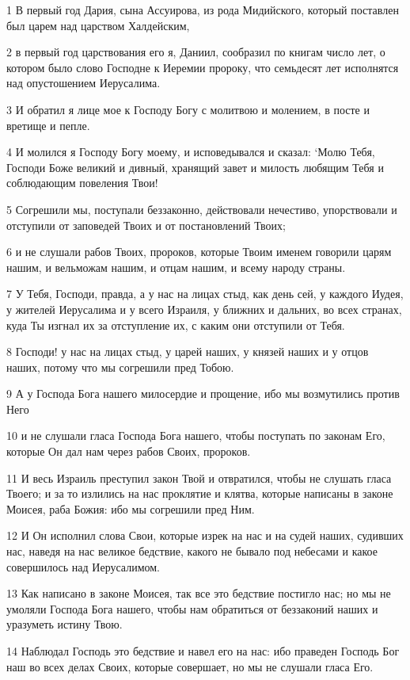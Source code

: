 \par 1 В первый год Дария, сына Ассуирова, из рода Мидийского, который поставлен был царем над царством Халдейским,
\par 2 в первый год царствования его я, Даниил, сообразил по книгам число лет, о котором было слово Господне к Иеремии пророку, что семьдесят лет исполнятся над опустошением Иерусалима.
\par 3 И обратил я лице мое к Господу Богу с молитвою и молением, в посте и вретище и пепле.
\par 4 И молился я Господу Богу моему, и исповедывался и сказал: `Молю Тебя, Господи Боже великий и дивный, хранящий завет и милость любящим Тебя и соблюдающим повеления Твои!
\par 5 Согрешили мы, поступали беззаконно, действовали нечестиво, упорствовали и отступили от заповедей Твоих и от постановлений Твоих;
\par 6 и не слушали рабов Твоих, пророков, которые Твоим именем говорили царям нашим, и вельможам нашим, и отцам нашим, и всему народу страны.
\par 7 У Тебя, Господи, правда, а у нас на лицах стыд, как день сей, у каждого Иудея, у жителей Иерусалима и у всего Израиля, у ближних и дальних, во всех странах, куда Ты изгнал их за отступление их, с каким они отступили от Тебя.
\par 8 Господи! у нас на лицах стыд, у царей наших, у князей наших и у отцов наших, потому что мы согрешили пред Тобою.
\par 9 А у Господа Бога нашего милосердие и прощение, ибо мы возмутились против Него
\par 10 и не слушали гласа Господа Бога нашего, чтобы поступать по законам Его, которые Он дал нам через рабов Своих, пророков.
\par 11 И весь Израиль преступил закон Твой и отвратился, чтобы не слушать гласа Твоего; и за то излились на нас проклятие и клятва, которые написаны в законе Моисея, раба Божия: ибо мы согрешили пред Ним.
\par 12 И Он исполнил слова Свои, которые изрек на нас и на судей наших, судивших нас, наведя на нас великое бедствие, какого не бывало под небесами и какое совершилось над Иерусалимом.
\par 13 Как написано в законе Моисея, так все это бедствие постигло нас; но мы не умоляли Господа Бога нашего, чтобы нам обратиться от беззаконий наших и уразуметь истину Твою.
\par 14 Наблюдал Господь это бедствие и навел его на нас: ибо праведен Господь Бог наш во всех делах Своих, которые совершает, но мы не слушали гласа Его.
